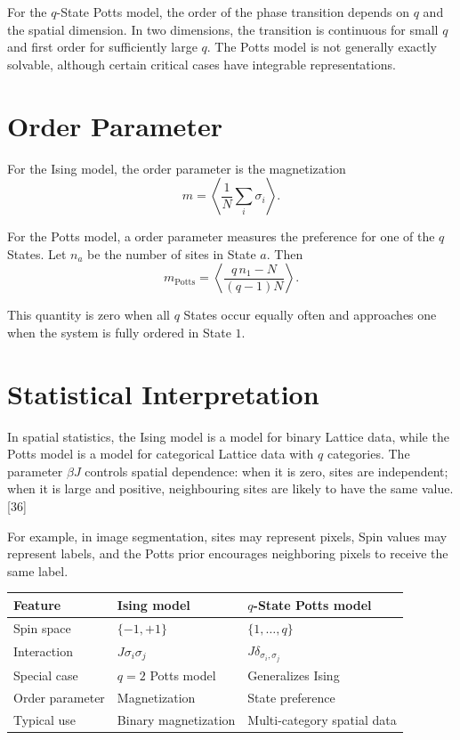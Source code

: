 \documentclass[a4paper, 10pt, onepage]{elegantbook}
\begin{document}
{For the \(q\)-State Potts model, the order of the phase transition depends on
\(q\) and the spatial dimension. In two dimensions, the transition is continuous
for small \(q\) and first order for sufficiently large \(q\). The Potts model is
not generally exactly solvable, although certain critical cases have integrable
representations.

\section{Order Parameter}

For the Ising model, the  order parameter is the magnetization
\[
m
=
\left\langle\frac{1}{N}\sum_i\sigma_i\right\rangle.
\]

For the Potts model, a  order parameter measures the preference for one
of the \(q\) States. Let \(n_a\) be the number of sites in State \(a\). Then
\[
m_{\mathrm{Potts}}
=
\left\langle
\frac{q\,n_1-N}{(q-1)N}
\right\rangle.
\]

This quantity is zero when all \(q\) States occur equally often and approaches
one when the system is fully ordered in State \(1\).

\section{Statistical Interpretation}

In spatial statistics, the Ising model is a model for binary Lattice data, while
the Potts model is a model for categorical Lattice data with \(q\) categories.
The parameter \(\beta J\) controls spatial dependence: when it is zero, sites
are independent; when it is large and positive, neighbouring sites are likely to
have the same value. [36]

For example, in image segmentation, sites may represent pixels, Spin values may
represent labels, and the Potts prior encourages neighboring pixels to receive
the same label.

\begin{center}
\begin{tabular}{lll}
\hline
Feature & Ising model & \(q\)-State Potts model \\
\hline
Spin space & \(\{-1,+1\}\) & \(\{1,\ldots,q\}\) \\
Interaction & \(J\sigma_i\sigma_j\) & \(J\delta_{\sigma_i,\sigma_j}\) \\
Special case & \(q=2\) Potts model & Generalizes Ising \\
Order parameter & Magnetization & State preference \\
Typical use & Binary magnetization & Multi-category spatial data \\
\hline
\end{tabular}
\end{center}

}
\end{document}

